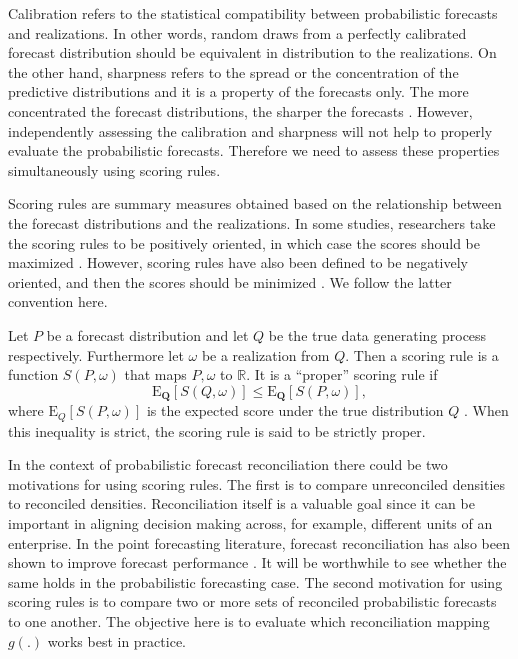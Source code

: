 \documentclass[12pt]{article}
\def\E{\text{E}}
\theoremstyle{definition}
\begin{document}
Calibration refers to the statistical compatibility between probabilistic forecasts and realizations. In other words, random draws from a perfectly calibrated forecast distribution should be equivalent in distribution to the realizations. On the other hand, sharpness refers to the spread or the concentration of the predictive distributions and it is a property of the forecasts only. The more concentrated the forecast distributions, the sharper the forecasts \citep{Gneiting2008}. However, independently assessing the calibration and sharpness will not help to properly evaluate the probabilistic forecasts. Therefore we need to assess these properties simultaneously using scoring rules.

Scoring rules are summary measures obtained based on the relationship between the forecast distributions and the realizations. In some studies, researchers take the scoring rules to be positively oriented, in which case the scores should be maximized \citep{Gneiting2007}. However, scoring rules have also been defined to be negatively oriented, and then the scores should be minimized \citep{Gneiting2014}. We follow the latter convention here.

Let $P$ be a forecast distribution and let $Q$ be the true data generating process respectively. Furthermore let $\omega$ be a realization from $Q$. Then a scoring rule is a function $S(P,\omega)$ that maps $P,\omega$ to $\mathbb{R}$. It is a ``proper'' scoring rule if
\begin{equation}\label{eq:(3.1.)}
\E_{\bm{Q}}[S(Q,\omega)] \le \E_{\bm{Q}}[S(P,\omega)] ,
\end{equation}
where $\E_{Q}[S(P,\omega)]$ is the expected score under the true distribution $Q$ \citep{Gneiting2008, Gneiting2014}. When this inequality is strict, the scoring rule is said to be strictly proper.

In the context of probabilistic forecast reconciliation there could be two motivations for using scoring rules. The first is to compare unreconciled densities to reconciled densities. Reconciliation itself is a valuable goal since it can be important in aligning decision making across, for example, different units of an enterprise. In the point forecasting literature, forecast reconciliation has also been shown to improve forecast performance \citep{AthEtAl2017, Wickramasuriya2017}. It will be worthwhile to see whether the same holds in the probabilistic forecasting case. The second motivation for using scoring rules is to compare two or more sets of reconciled probabilistic forecasts to one another. The objective here is to evaluate which reconciliation mapping $g(.)$ works best in practice.
\end{document}
